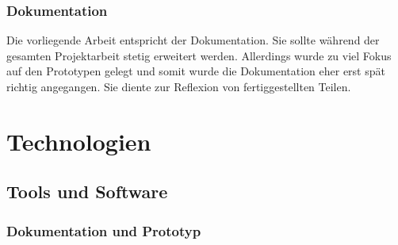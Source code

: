 \subsubsection{Dokumentation}
\label{ssubsec:documentation}

Die vorliegende Arbeit entspricht der Dokumentation. Sie sollte während der
gesamten Projektarbeit stetig erweitert werden. Allerdings wurde zu viel Fokus
auf den Prototypen gelegt und somit wurde die Dokumentation eher erst spät
richtig angegangen. Sie diente zur Reflexion von fertiggestellten Teilen.

\section{Technologien}
\label{sec:technologies}

\subsection{Tools und Software}
\label{subsec:tools_software}

\subsubsection{Dokumentation und Prototyp}
\label{ssubsec:tools_software:documentation_prototype}

